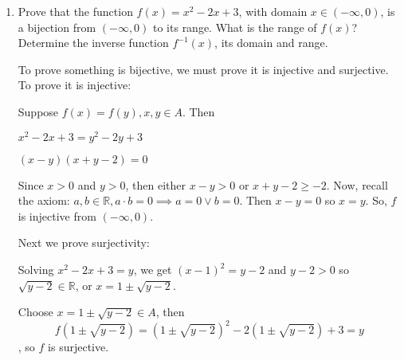 \documentclass[10pt]{article} %
\newcommand{\R}{\mathbb{R}}
\begin{document}
\begin{enumerate}
\begin{enumerate}
\begin{proof}
  Suppose: $f(x)=f(y)$ or $x^2-2x+3=y^2-2y+3$
  
  $x^2-2x=y^2-2y$
  
  $x^2-y^2-2x+2y=0$
  
  $(x^2-y^2)+(-2x+2y)=0$
  
  $(x+y)(x-y)-2(x-y)=0$
  
  $(x-y)(x+y-2)=0$
  
  Now, let $x=0$ and $x=2$ so that:
  
  $f(0)=0^2-2(0)+3$ and $f(2)=2^2-2(2)+3=3$.  So, $f$ is not injective since $f(0)=f(2)=3$.  
  
  Next we prove that $f$ is not surjective.  
  
  Set $x^2-2x+3=y$
  
  $x^2-2x+1-1+3=y$
  
  $(x-1)^2=y-2$
  
  So, $\forall x\in \R$, $(x-1)^2\geq0$.  Now, choose $y=-15$, then $y-2=-15-2=-17<0$.  
  
  This implies that for $y=-15$, $\forall x\in \R, x^2-2x+3 \neq -15$.  So, $f:\R \to \R$ is not surjective.  
  
  \end{proof}
  
  \item Prove that the function $f(x)=x^2-2x+3$, with domain $x\in (-\infty,0)$, is a bijection from $(-\infty,0)$ to its range. What is the range of $f(x)$? Determine the inverse function $f^{-1}(x)$, its domain and range.
  
   To prove something is bijective, we must prove it is injective and surjective.  To prove it is injective:
  
  Suppose $f(x)=f(y), x,y\in A$.  Then
  
  $x^2-2x+3=y^2-2y+3$
  
  $(x-y)(x+y-2)=0$ 
  
  Since $x>0$ and $y>0$, then either $x-y>0$ or $x+y-2\geq-2$.  Now, recall the axiom: $a,b \in \R, a \cdot b=0 \implies a=0 \vee b=0$.  Then $x-y=0$ so $x=y$.  So, $f$ is injective from $(- \infty,0)$.  
  
  Next we prove surjectivity:
  
  Solving $x^2-2x+3=y$, we get $(x-1)^2=y-2$ and $y-2>0$ so $\sqrt{y-2} \in\R$, or $x=1\pm \sqrt{y-2}$.  
  
  Choose $x=1\pm \sqrt{y-2} \in A$, then $$f(1\pm \sqrt{y-2})=(1\pm 
\sqrt{y-2})^2-2(1\pm \sqrt{y-2})+3=y$$, so $f$ is surjective.  


\end{enumerate}
\end{enumerate}
\end{document}
